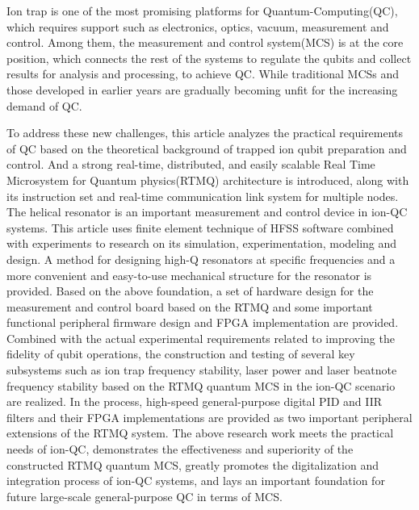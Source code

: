 \begin{abstract*}
  Ion trap is one of the most promising platforms for Quantum-Computing(QC), which requires support such as electronics, optics, vacuum, measurement and control. 
  Among them, the measurement and control system(MCS) is at the core position, which connects the rest of the systems to regulate the qubits and collect results for analysis and processing, to achieve QC. 
  While traditional MCSs and those developed in earlier years are gradually becoming unfit for the increasing demand of QC.
 
  To address these new challenges, this article analyzes the practical requirements of QC based on the theoretical background of trapped ion qubit preparation and control. 
  And a strong real-time, distributed, and easily scalable Real Time Microsystem for Quantum physics(RTMQ) architecture is introduced, along with its instruction set and real-time communication link system for multiple nodes. 
  The helical resonator is an important measurement and control device in ion-QC systems. This article uses finite element technique of HFSS software combined with experiments to research on its simulation, experimentation, modeling and design. A method for designing high-Q resonators at specific frequencies and a more convenient and easy-to-use mechanical structure for the resonator is provided. 
  Based on the above foundation, a set of hardware design for the measurement and control board based on the RTMQ and some important functional peripheral firmware design and FPGA implementation are provided. 
  Combined with the actual experimental requirements related to improving the fidelity of qubit operations, the construction and testing of several key subsystems such as ion trap frequency stability, laser power and laser beatnote frequency stability based on the RTMQ quantum MCS in the ion-QC scenario are realized. 
  In the process, high-speed general-purpose digital PID and IIR filters and their FPGA implementations are provided as two important peripheral extensions of the RTMQ system. 
  The above research work meets the practical needs of ion-QC, demonstrates the effectiveness and superiority of the constructed RTMQ quantum MCS, greatly promotes the digitalization and integration process of ion-QC systems, and lays an important foundation for future large-scale general-purpose QC in terms of MCS.


\end{abstract*}
